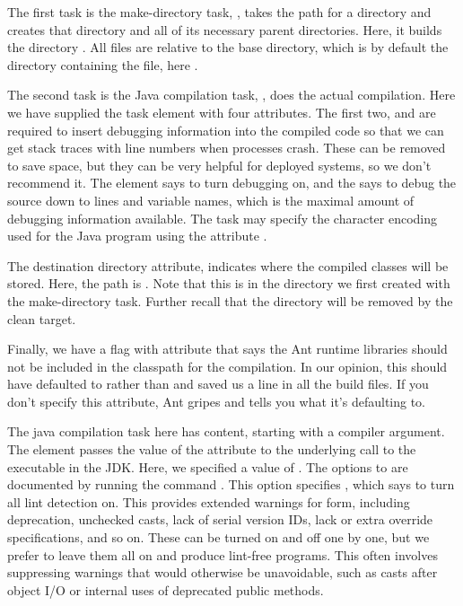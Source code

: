 The first task is the make-directory task, , takes the
path for a directory and creates that directory and all of its
necessary parent directories.  Here, it builds the directory
.  All files are relative to the base
directory, which is by default the directory containing the
 file, here .

The second task is the Java compilation task, , does the
actual compilation.  Here we have supplied the task element with four
attributes.  The first two,  and  are
required to insert debugging information into the compiled code so
that we can get stack traces with line numbers when processes crash.
These can be removed to save space, but they can be very helpful for
deployed systems, so we don't recommend it.  The  element
says to turn debugging on, and the  says to debug the
source down to lines and variable names, which is the maximal amount
of debugging information available.  The  task may specify
the character encoding used for the Java program using the attribute
.

The destination directory attribute,  indicates where
the compiled classes will be stored.  Here, the path is .
Note that this is in the directory we first created with the
make-directory task.  Further recall that the  directory
will be removed by the clean target.

Finally, we have a flag with attribute  that
says the Ant runtime libraries should not be included in the classpath
for the compilation.  In our opinion, this should have defaulted to
 rather than  and saved us a line in all the
build files.  If you don't specify this attribute, Ant gripes and
tells you what it's defaulting to.

The java compilation task here has content, starting with a compiler
argument.  The element  passes the value of the
attribute  to the underlying call to the 
executable in the JDK.  Here, we specified a value of 
.  The  options to  are
documented by running the command .  This 
option specifies , which says to turn all lint
detection on.  This provides extended warnings for form, including
deprecation, unchecked casts, lack of serial version IDs, lack or
extra override specifications, and so on.  These can be turned on and
off one by one, but we prefer to leave them all on and produce
lint-free programs.  This often involves suppressing warnings that
would otherwise be unavoidable, such as casts after object I/O or
internal uses of deprecated public methods.

